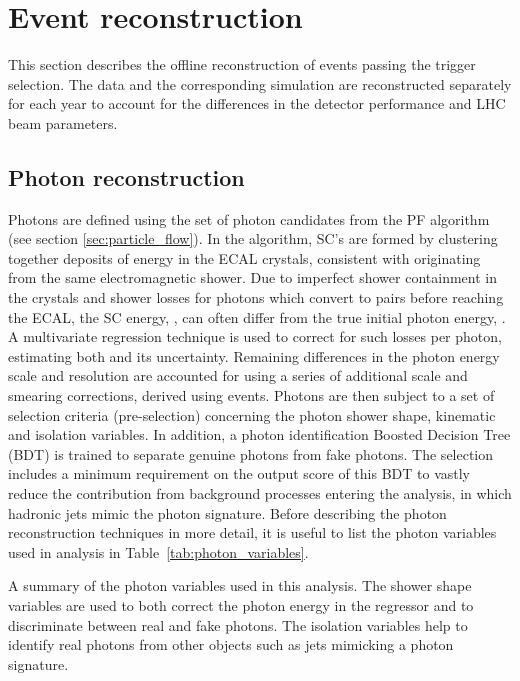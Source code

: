 \section{Event reconstruction}\label{sec:event_reconstruction}
This section describes the offline reconstruction of events passing the trigger selection. The data and the corresponding simulation are reconstructed separately for each year to account for the differences in the detector performance and LHC beam parameters. 

\subsection{Photon reconstruction}\label{sec:photon_reconstruction}
Photons are defined using the set of photon candidates from the PF algorithm (see section \ref{sec:particle_flow}). In the algorithm, SC's are formed by clustering together deposits of energy in the ECAL crystals, consistent with originating from the same electromagnetic shower. Due to imperfect shower containment in the crystals and shower losses for photons which convert to \ee pairs before reaching the ECAL, the SC energy, \Eraw, can often differ from the true initial photon energy, \Etrue. A multivariate regression technique is used to correct for such losses per photon, estimating both \Etrue and its uncertainty. Remaining differences in the photon energy scale and resolution are accounted for using a series of additional scale and smearing corrections, derived using \Zee events. Photons are then subject to a set of selection criteria (pre-selection) concerning the photon shower shape, kinematic and isolation variables. In addition, a photon identification Boosted Decision Tree (BDT) is trained to separate genuine photons from fake photons. The selection includes a minimum requirement on the output score of this BDT to vastly reduce the contribution from background processes entering the analysis, in which hadronic jets mimic the photon signature. Before describing the photon reconstruction techniques in more detail, it is useful to list the photon variables used in \Hgg analysis in Table~\ref{tab:photon_variables}.

\begin{table}[htb!]
    \caption[Photon variables]{A summary of the photon variables used in this analysis. The shower shape variables are used to both correct the photon energy in the regressor and to discriminate between real and fake photons. The isolation variables help to identify real photons from other objects such as jets mimicking a photon signature.}
    \label{tab:photon_variables}
    \centering
    \scriptsize
    \renewcommand{\arraystretch}{2}
    \hspace*{-1.5cm}
    
    \hspace*{-1.5cm}
\end{table}

